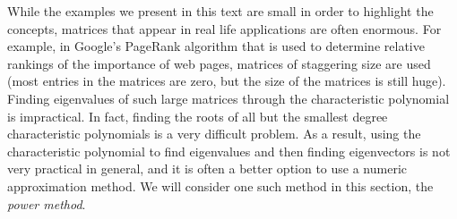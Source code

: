 
While the examples we present in this text are small in order to highlight the concepts, matrices that appear in real life applications are often enormous. For example, in Google's PageRank algorithm that is used to determine relative rankings of the importance of web pages, matrices of staggering size are used (most entries in the matrices are zero, but the size of the matrices is still huge). Finding eigenvalues of such large matrices through the characteristic polynomial is impractical. In fact, finding the roots of all but the smallest degree characteristic polynomials is a very difficult problem. As a result, using the characteristic polynomial to find eigenvalues and then finding eigenvectors is not very practical in general, and it is often a better option to use a numeric approximation method. We will consider one such method in this section, the \emph{power method}. 

